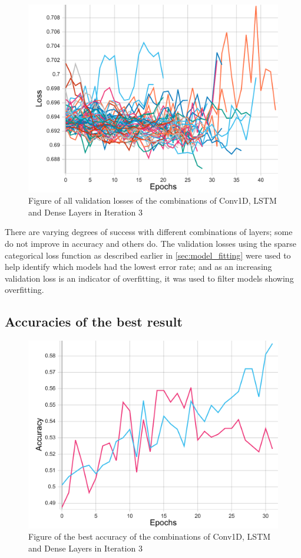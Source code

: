 \begin{figure}[ht]
    \centering
    \includegraphics[width=0.95\columnwidth]{figures/results/cnnlstm/cnnlstm_all_loss.pdf}
    \caption[Validation losses for Iteration 3]{Figure of all validation losses of the combinations of Conv1D, LSTM and Dense Layers in Iteration 3}
    \label{fig:iteration3_all_loss}
\end{figure}
\FloatBarrier

There are varying degrees of success with different combinations of layers; some do not improve in accuracy and others do.
The validation losses using the sparse categorical loss function as described earlier in \autoref{sec:model_fitting}
were used to help identify which models had the lowest error rate; and as an increasing validation
loss is an indicator of overfitting, it was used to filter models showing overfitting.

\subsection{Accuracies of the best result}
\begin{figure}[ht]
    \centering
    \includegraphics[width=0.95\columnwidth]{figures/results/cnnlstm/cnnlstm_2C32-1L16-2D64_acc.pdf}
    \caption[Best accuracy for Iteration 3]{Figure of the best accuracy of the combinations of Conv1D, LSTM and Dense Layers in Iteration 3}
    \label{fig:iteration3_best_accuracy}
\end{figure}
\FloatBarrier

